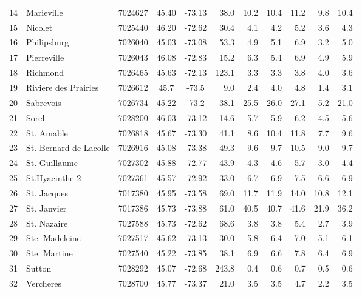 \documentclass[WHATMANUAL.tex]{subfiles}
\begin{document}
\begin{table}[!ht]
\begin{tabular}{r>{\RaggedRight}p{2.8cm}*3{c}d*5{d}}
14 & Marieville & 7024627 & 45.40 & -73.13 & 38.0 & 10.2 & 10.4 & 11.2 & 9.8 & 10.4 \\
15 & Nicolet & 7025440 & 46.20 & -72.62 & 30.4 & 4.1 & 4.2 & 5.2 & 3.6 & 4.3 \\
16 & Philipsburg & 7026040 & 45.03 & -73.08 & 53.3 & 4.9 & 5.1 & 6.9 & 3.2 & 5.0 \\
17 & Pierreville & 7026043 & 46.08 & -72.83 & 15.2 & 6.3 & 5.4 & 6.9 & 4.9 & 5.9 \\
18 & Richmond & 7026465 & 45.63 & -72.13 & 123.1 & 3.3 & 3.3 & 3.8 & 4.0 & 3.6 \\
19 & Riviere des Prairies & 7026612 & 45.7 & -73.5 & 9.0 & 2.4 & 4.0 & 4.8 & 1.4 & 3.1 \\
20 & Sabrevois & 7026734 & 45.22 & -73.2 & 38.1 & 25.5 & 26.0 & 27.1 & 5.2 & 21.0 \\
21 & Sorel & 7028200 & 46.03 & -73.12 & 14.6 & 5.7 & 5.9 & 6.2 & 4.5 & 5.6 \\
22 & St. Amable & 7026818 & 45.67 & -73.30 & 41.1 & 8.6 & 10.4 & 11.8 & 7.7 & 9.6 \\
23 & St. Bernard de Lacolle & 7026916 & 45.08 & -73.38 & 49.3 & 9.6 & 9.7 & 10.5 & 9.0 & 9.7 \\
24 & St. Guillaume & 7027302 & 45.88 & -72.77 & 43.9 & 4.3 & 4.6 & 5.7 & 3.0 & 4.4 \\
25 & St.Hyacinthe 2 & 7027361 & 45.57 & -72.92 & 33.0 & 6.7 & 6.9 & 7.5 & 6.6 & 6.9 \\
26 & St. Jacques & 7017380 & 45.95 & -73.58 & 69.0 & 11.7 & 11.9 & 14.0 & 10.8 & 12.1 \\
27 & St. Janvier & 7017386 & 45.73 & -73.88 & 61.0 & 40.5 & 40.7 & 41.6 & 21.9 & 36.2 \\
28 & St. Nazaire & 7027588 & 45.73 & -72.62 & 68.6 & 3.8 & 3.8 & 5.4 & 2.7 & 3.9 \\
29 & Ste. Madeleine & 7027517 & 45.62 & -73.13 & 30.0 & 5.8 & 6.4 & 7.0 & 5.1 & 6.1 \\
30 & Ste. Martine & 7027540 & 45.22 & -73.85 & 38.1 & 6.9 & 6.6 & 7.8 & 6.4 & 6.9 \\
31 & Sutton & 7028292 & 45.07 & -72.68 & 243.8 & 0.4 & 0.6 & 0.7 & 0.5 & 0.6 \\
32 & Vercheres & 7028700 & 45.77 & -73.37 & 21.0 & 3.5 & 3.5 & 4.7 & 2.2 & 3.5 \\
\bottomrule
\end{tabular}
\label{tab:selectedStations}
\end{table}
\end{document}

